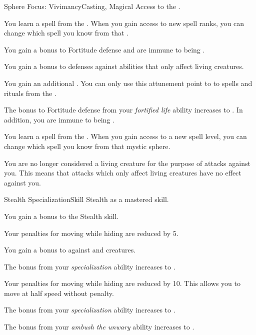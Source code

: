     \begin{feat}{Sphere Focus: Vivimancy}{Casting, Magical}
        \featpre Access to the  .

         You learn a spell from the  .
        When you gain access to new spell ranks, you can change which spell you know from that .

         You gain a  bonus to Fortitude defense and are immune to being \sickened.

         You gain a  bonus to defenses against abilities that only affect living creatures.

         You gain an additional .
        You can only use this attunement point to  to spells and rituals from the  .

         The bonus to Fortitude defense from your \textit{fortified life} ability increases to .
        In addition, you are immune to being \nauseated.

         You learn a spell from the  .
        When you gain access to a new spell level, you can change which spell you know from that mystic sphere.

         You are no longer considered a living creature for the purpose of attacks against you.
        This means that attacks which only affect living creatures have no effect against you.
    \end{feat}

    \begin{feat}{Stealth Specialization}{Skill}
        \featpre Stealth as a mastered skill.

         You gain a  bonus to the Stealth skill.

         Your penalties for moving while hiding are reduced by 5.

         You gain a  bonus to  against \unaware and \partiallyunaware creatures.

         The bonus from your \textit{specialization} ability increases to .

         Your penalties for moving while hiding are reduced by 10.
        This allows you to move at half speed without penalty.

         The bonus from your \textit{specialization} ability increases to .

         The bonus from your \textit{ambush the unwary} ability increases to .
    \end{feat}

